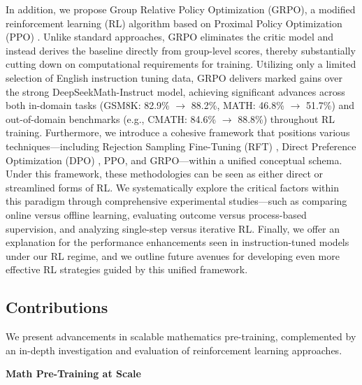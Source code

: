 In addition, we propose Group Relative Policy Optimization (GRPO), a modified reinforcement learning (RL) algorithm based on Proximal Policy Optimization (PPO) \citep{schulman2017proximal}. Unlike standard approaches, GRPO eliminates the critic model and instead derives the baseline directly from group-level scores, thereby substantially cutting down on computational requirements for training. Utilizing only a limited selection of English instruction tuning data, GRPO delivers marked gains over the strong DeepSeekMath-Instruct model, achieving significant advances across both in-domain tasks (GSM8K: 82.9\% $\rightarrow$ 88.2\%, MATH: 46.8\% $\rightarrow$ 51.7\%) and out-of-domain benchmarks (e.g., CMATH: 84.6\% $\rightarrow$ 88.8\%) throughout RL training. Furthermore, we introduce a cohesive framework that positions various techniques—including Rejection Sampling Fine-Tuning (RFT) \citep{yuan2023scaling}, Direct Preference Optimization (DPO) \citep{dpo}, PPO, and GRPO—within a unified conceptual schema. Under this framework, these methodologies can be seen as either direct or streamlined forms of RL. We systematically explore the critical factors within this paradigm through comprehensive experimental studies—such as comparing online versus offline learning, evaluating outcome versus process-based supervision, and analyzing single-step versus iterative RL. Finally, we offer an explanation for the performance enhancements seen in instruction-tuned models under our RL regime, and we outline future avenues for developing even more effective RL strategies guided by this unified framework.

\subsection{Contributions}
We present advancements in scalable mathematics pre-training, complemented by an in-depth investigation and evaluation of reinforcement learning approaches.

\textbf{Math Pre-Training at Scale}

